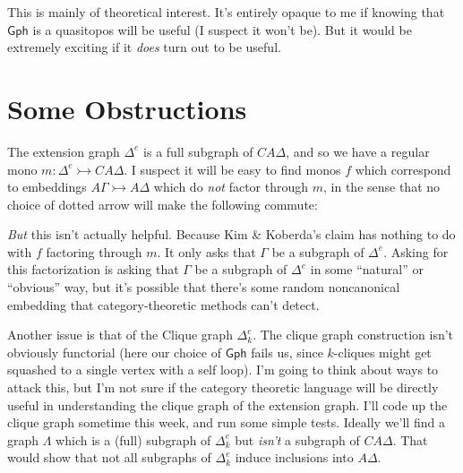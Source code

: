 \documentclass[12pt]{article}
\theoremstyle{definition}
\newcommand{\monor}{\rightarrowtail}
\begin{document}
This is mainly of theoretical interest. It's entirely opaque to me if knowing
that $\mathsf{Gph}$ is a quasitopos will be useful (I suspect it won't be). 
But it would be extremely exciting if it \emph{does} turn out to be useful.

\section{Some Obstructions}

The extension graph $\Delta^e$ is a full subgraph of $CA\Delta$, and so
we have a regular mono $m : \Delta^e \monor CA\Delta$. I suspect it will
be easy to find monos $f$ which correspond to embeddings $A\Gamma \monor A\Delta$
which do \emph{not} factor through $m$, in the sense that no choice of dotted
arrow will make the following commute:

\begin{center}
\end{center}

\emph{But} this isn't actually helpful. Because Kim \& Koberda's claim has
nothing to do with $f$ factoring through $m$. It only asks that $\Gamma$
be a subgraph of $\Delta^e$. Asking for this factorization is asking that
$\Gamma$ be a subgraph of $\Delta^e$ in some ``natural'' or ``obvious'' way,
but it's possible that there's some random noncanonical embedding that
category-theoretic methods can't detect.

Another issue is that of the Clique graph $\Delta^e_k$. The clique graph
construction isn't obviously functorial (here our choice of $\mathsf{Gph}$ fails us,
since $k$-cliques might get squashed to a single vertex with a self loop).
I'm going to think about ways to attack this, but I'm not sure if the category
theoretic language will be directly useful in understanding the clique graph
of the extension graph. I'll code up the clique graph sometime this week, and
run some simple tests. Ideally we'll find a graph $\Lambda$ which is
a (full) subgraph of $\Delta^e_k$ but \emph{isn't} a subgraph of $CA\Delta$.
That would show that not all subgraphs of $\Delta^e_k$ induce inclusions
into $A\Delta$.

% 
% 
\end{document}
